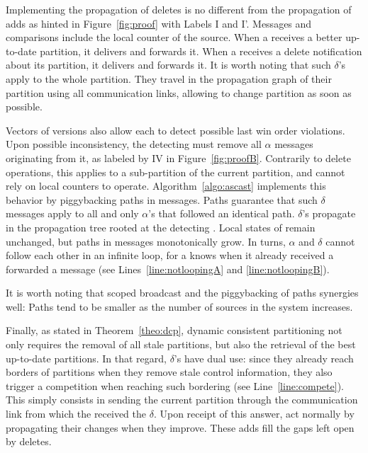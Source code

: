 Implementing the propagation of deletes is no different from the
propagation of adds as hinted in Figure~\ref{fig:proof} with Labels I
and I'. Messages and comparisons include the local counter of the
source. When a \process receives a better up-to-date partition, it
delivers and forwards it. When a \process receives a delete
notification about its partition, it delivers and forwards it. It is
worth noting that such $\delta$'s apply to the whole partition. They
travel in the propagation graph of their partition using all
communication links, allowing \processes to change partition as soon as
possible.

Vectors of versions also allow each \process to detect possible last
win order violations. Upon possible inconsistency, the detecting
\process must remove all $\alpha$ messages originating from it, as
labeled by IV in Figure~\ref{fig:proofB}. Contrarily to delete
operations, this applies to a sub-partition of the current partition,
and cannot rely on local counters to
operate. Algorithm~\ref{algo:ascast} implements this behavior by
piggybacking paths in messages. Paths guarantee that such $\delta$
messages apply to all and only $\alpha$'s that followed an identical
path. $\delta$'s propagate in the propagation tree rooted at the
detecting \process. Local states of \processes remain unchanged, but
paths in messages monotonically grow. In turns, $\alpha$ and $\delta$
cannot follow each other in an infinite loop, for a \process knows when
it already received a forwarded a message (see
Lines~\ref{line:notloopingA} and \ref{line:notloopingB}).

\noindent It is worth noting that scoped broadcast and the
piggybacking of paths synergies well: Paths tend to be smaller as the
number of sources in the system increases.

Finally, as stated in Theorem~\ref{theo:dcp}, dynamic consistent
partitioning not only requires the removal of all stale partitions,
but also the retrieval of the best up-to-date partitions. In that
regard, $\delta$'s have dual use: since they already reach borders of
partitions when they remove stale control information, they also
trigger a competition when reaching such bordering \processes (see
Line~\ref{line:compete}). This simply consists in sending the current
partition through the communication link from which the \process
received the $\delta$. Upon receipt of this answer, \processes act
normally by propagating their changes when they improve. These adds
fill the gaps left open by deletes.

